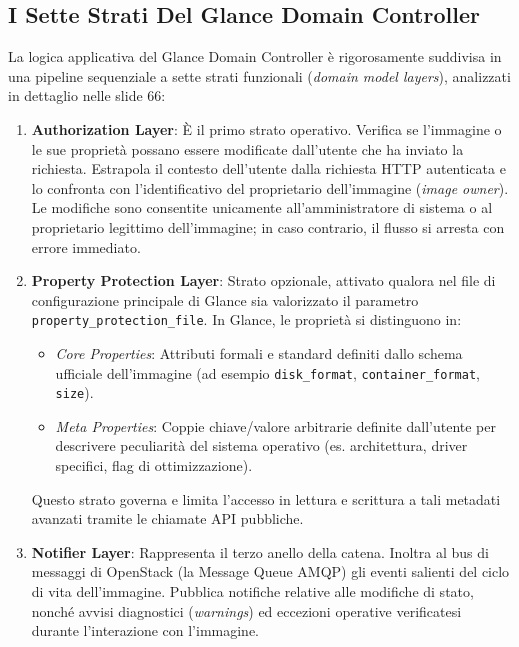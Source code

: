 \documentclass[11pt, a4paper]{article}
\begin{document}
\subsection{I Sette Strati Del Glance Domain Controller}

La logica applicativa del Glance Domain Controller è rigorosamente suddivisa in una pipeline sequenziale a sette strati funzionali (\emph{domain model layers}), analizzati in dettaglio nelle slide 66:

\begin{enumerate}
    \item \textbf{Authorization Layer}: È il primo strato operativo. Verifica se l'immagine o le sue proprietà possano essere modificate dall'utente che ha inviato la richiesta. Estrapola il contesto dell'utente dalla richiesta HTTP autenticata e lo confronta con l'identificativo del proprietario dell'immagine (\emph{image owner}). Le modifiche sono consentite unicamente all'amministratore di sistema o al proprietario legittimo dell'immagine; in caso contrario, il flusso si arresta con errore immediato.

    \item \textbf{Property Protection Layer}: Strato opzionale, attivato qualora nel file di configurazione principale di Glance sia valorizzato il parametro \texttt{property\_protection\_file}. In Glance, le proprietà si distinguono in:
    \begin{itemize}[noitemsep]
        \item \emph{Core Properties}: Attributi formali e standard definiti dallo schema ufficiale dell'immagine (ad esempio \texttt{disk\_format}, \texttt{container\_format}, \texttt{size}).
        \item \emph{Meta Properties}: Coppie chiave/valore arbitrarie definite dall'utente per descrivere peculiarità del sistema operativo (es. architettura, driver specifici, flag di ottimizzazione).
    \end{itemize}
    Questo strato governa e limita l'accesso in lettura e scrittura a tali metadati avanzati tramite le chiamate API pubbliche.

    \item \textbf{Notifier Layer}: Rappresenta il terzo anello della catena. Inoltra al bus di messaggi di OpenStack (la Message Queue AMQP) gli eventi salienti del ciclo di vita dell'immagine. Pubblica notifiche relative alle modifiche di stato, nonché avvisi diagnostici (\emph{warnings}) ed eccezioni operative verificatesi durante l'interazione con l'immagine.


\end{enumerate}
\end{document}
